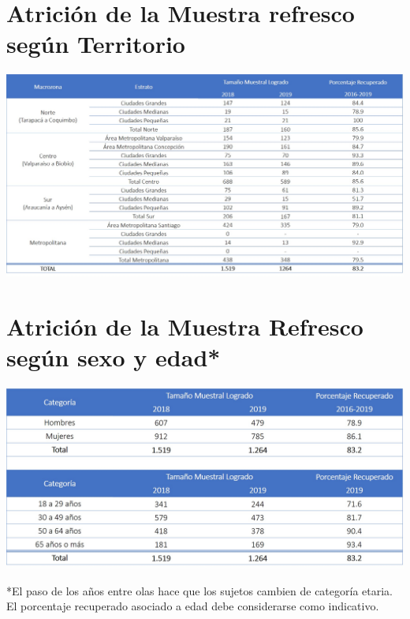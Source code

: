 \documentclass[
  12pt,
]{book}
\begin{document}
\hypertarget{atriciuxf3n-de-la-muestra-refresco-seguxfan-territorio}{%
\section{Atrición de la Muestra refresco según Territorio}\label{atriciuxf3n-de-la-muestra-refresco-seguxfan-territorio}}

\begin{center}\includegraphics[width=1.5\linewidth,height=1.5\textheight]{inputs/images/atricion_ref_territorio} \end{center}

\hypertarget{atriciuxf3n-de-la-muestra-refresco-seguxfan-sexo-y-edad}{%
\section{Atrición de la Muestra Refresco según sexo y edad*}\label{atriciuxf3n-de-la-muestra-refresco-seguxfan-sexo-y-edad}}

\begin{center}\includegraphics[width=1\linewidth,height=1\textheight]{inputs/images/atricion_ref_sexo_edad} \end{center}

*El paso de los años entre olas hace que los sujetos cambien de categoría etaria. El porcentaje recuperado asociado a edad debe considerarse como indicativo.
\end{document}
